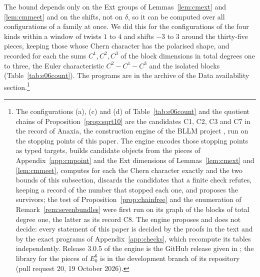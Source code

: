 The bound depends only on the Ext groups of Lemmas~\ref{lem:cmext} and \ref{lem:cmmeet} and on the shifts, not on $\delta$, so it can be computed over all configurations of a family at once. We did this for the configurations of the four kinds within a window of twists $1$ to $4$ and shifts $-3$ to $3$ around the thirty-five pieces, keeping those whose Chern character has the polarised shape, and recorded for each the sums $C^{1},C^{2},C^{3}$ of the block dimensions in total degrees one to three, the Euler characteristic $C^{2}-C^{1}-C^{3}$ and the isolated blocks (Table~\ref{tab:e06count}). The programs are in the archive of the Data availability section.\footnote{The configurations (a), (c) and (d) of Table~\ref{tab:e06count} and the quotient chains of Proposition~\ref{prop:sqrt10} are the candidates C1, C2, C3 and C7 in the record of Anaxia, the construction engine of the BLLM project \cite{Bha26bllm}, run on the stopping points of this paper. The engine encodes those stopping points as typed targets, builds candidate objects from the pieces of Appendix~\ref{app:cmpoint} and the Ext dimensions of Lemmas~\ref{lem:cmext} and \ref{lem:cmmeet}, computes for each the Chern character exactly and the two bounds of this subsection, discards the candidates that a finite check refutes, keeping a record of the number that stopped each one, and proposes the survivors; the test of Proposition~\ref{prop:chainfree} and the enumeration of Remark~\ref{rem:sevenbundles} were first run on its graph of the blocks of total degree one, the latter as its record C8. The engine proposes and does not decide: every statement of this paper is decided by the proofs in the text and by the exact programs of Appendix~\ref{app:checks}, which recompute its tables independently. Release 3.0.5 of the engine is the GitHub release given in \cite{Bha26bllm}; the library for the pieces of $E_{0}^{6}$ is in the development branch of its repository (pull request 20, 19 October 2026).}

